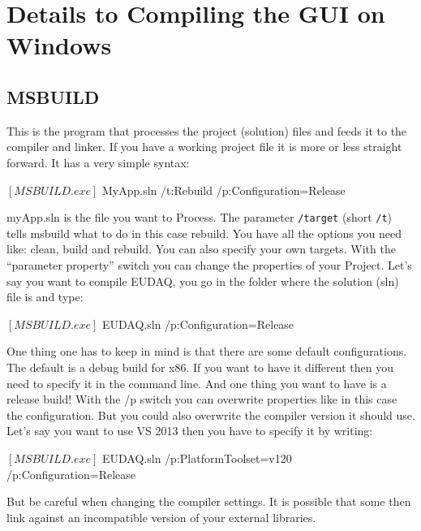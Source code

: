 \section{Details to Compiling the GUI on Windows}
\label{app:compileOnWindows}

\subsection{MSBUILD}

This is the program that processes the project (solution) files and feeds it to the compiler and linker. If you have a working project file it is more or less straight forward. It has a very simple syntax:

      \begin{listing}[mybash]
$[MSBUILD.exe]$ MyApp.sln /t:Rebuild /p:Configuration=Release
\end{listing}

myApp.sln is the file you want to Process. The parameter \texttt{/target} (short \texttt{/t}) tells msbuild what to do in this case rebuild. You have all the options you need like: clean, build and rebuild. You can also specify your own targets. With the ``parameter property'' switch you can change the properties of your Project. Let's say you want to compile EUDAQ, you go in the folder where the solution (sln) file is and type:

      \begin{listing}[mybash]
$[MSBUILD.exe]$ EUDAQ.sln /p:Configuration=Release 
\end{listing}

One thing one has to keep in mind is that there are some default configurations. The default is a debug build for x86. If you want to have it different then you need to specify it in the command line. And one thing you want to have is a release build! With the /p switch you can overwrite properties like in this case the configuration. But you could also overwrite the compiler version it should use. Let's say you want to use VS 2013 then you have to specify it by writing:

      \begin{listing}[mybash]
$[MSBUILD.exe]$ EUDAQ.sln /p:PlatformToolset=v120 /p:Configuration=Release
\end{listing}

But be careful when changing the compiler settings. It is possible that some then link against an incompatible version of your external libraries. 

